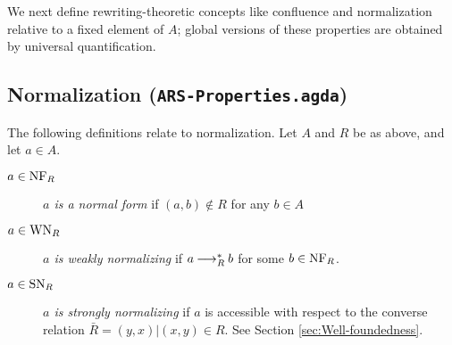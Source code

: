 We next define rewriting-theoretic concepts like confluence and normalization relative to a fixed element of $A$; global versions of these properties are obtained by universal quantification.
\subsection{Normalization (\texttt{ARS-Properties.agda})}
\begin{definition} The following definitions relate to normalization. Let $A$ and $R$ be as above, and let $a \in A$.
  \begin{description}
    \item[$a \in \mathrm{NF}_R$] \emph{$a$ is a normal form} if $(a,b) \notin R$ for any $b \in A$ 
    \item[$a \in \mathrm{WN}_R$] \emph{$a$ is weakly normalizing} if $a \mathbin{\longrightarrow_R^*} b$ for some $b \in \mathrm{NF}_R$.
    \item[$a \in \mathrm{SN}_R$] \emph{$a$ is strongly normalizing} if $a$ is accessible with respect to the converse relation $\bar{R} = {(y,x) | (x,y) \in R}$. See Section \ref{sec:Well-foundedness}. 
  \end{description}
\end{definition} 

 

